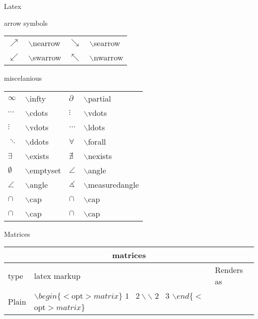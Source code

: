 \begin{section}{Latex}
\begin{subsection}{arrow symbols}
\begin{tabular}{ |m{1cm}|m{4cm}|m{1cm}|m{4cm} | }
			$\nearrow$ & $\backslash$nearrow &
			$\searrow$ & $\backslash$searrow \\
		
			$\swarrow$ & $\backslash$swarrow &
			$\nwarrow$ & $\backslash$nwarrow \\
		\hline
		\end{tabular}
				
	\end{subsection}
	\begin{subsection}{miscelanious}
		\begin{tabular}{ |m{1cm}|m{4cm}|m{1cm}| m{4cm} | }
		\hline
		
			$\infty$ & $\backslash$infty &
			$\partial$ & $\backslash$partial \\
		
			$\cdots$ & $\backslash$cdots &
			$\vdots$ & $\backslash$vdots \\
		
			$\vdots$ & $\backslash$vdots &
			$\ldots$ & $\backslash$ldots \\
		
			$\ddots$ & $\backslash$ddots &
			$\forall$ & $\backslash$forall \\
		
			$\exists$ & $\backslash$exists &
			$\nexists$ & $\backslash$nexists \\
		
			$\emptyset$ & $\backslash$emptyset &
			$\angle$ & $\backslash$angle \\
		
			$\angle$ & $\backslash$angle &
			$\measuredangle$ & $\backslash$measuredangle \\
		
			$\cap$ & $\backslash$cap &
			$\cap$ & $\backslash$cap \\
		
			$\cap$ & $\backslash$cap &
			$\cap$ & $\backslash$cap \\
		\hline
		\end{tabular}
				
	\end{subsection}
	\begin{subsection}{Matrices}
	
		\begin{tabular}{ |m{5cm}|m{5cm}|m{5cm}|  }
		\hline
			\multicolumn{3}{|c|}{matrices} \\
			\hline
		
			type & latex markup & Renders as \\
			\hline
			Plain & 
			$ \backslash begin \{<$opt$>matrix \} $ \newline
			$ 1 \; \; \; 2 \backslash \backslash $ \newline
			$ 2 \; \; \; 3 $ \newline
			$ \backslash end \{<$opt$> matrix \} $ 
		

\end{tabular}
\end{subsection}
\end{section}
